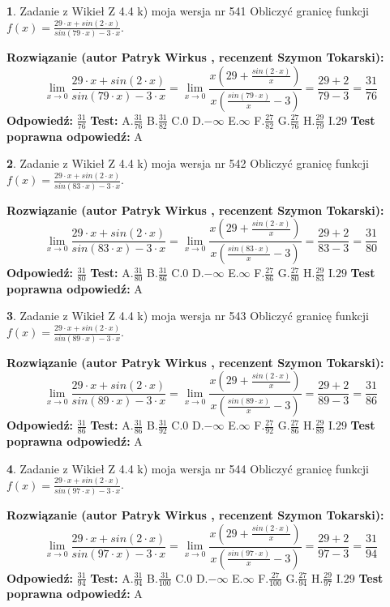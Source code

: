 \documentclass[12pt, a4paper]{article}
\theoremstyle{definition} %
\newtheorem{zad}{}
\newcommand{\zadStart}[1]{\begin{zad}#1\newline}
\newcommand{\zadStop}{\end{zad}}
\newcommand{\rozwStart}[2]{\noindent \textbf{Rozwiązanie (autor #1 , recenzent #2): }\newline}
\newcommand{\rozwStop}{\newline}
\newcommand{\odpStart}{\noindent \textbf{Odpowiedź:}\newline}
\newcommand{\odpStop}{\newline}
\newcommand{\testStart}{\noindent \textbf{Test:}\newline}
\newcommand{\testStop}{\newline}
\newcommand{\kluczStart}{\noindent \textbf{Test poprawna odpowiedź:}\newline}
\newcommand{\kluczStop}{\newline}
\begin{document}
\zadStart{Zadanie z Wikieł Z 4.4 k) moja wersja nr 541}
Obliczyć granicę funkcji $f(x)=\frac{29\cdot x +sin(2\cdot x)}{sin(79\cdot x) -3\cdot x}$.
\zadStop
\rozwStart{Patryk Wirkus}{Szymon Tokarski}
$$\lim\limits_{x\to 0}\frac{29\cdot x +sin(2\cdot x)}{sin(79\cdot x) -3\cdot x}
=\lim\limits_{x\to 0}\frac{x(29+\frac{sin(2\cdot x)}{x})}{x(\frac{sin(79\cdot x)}{x}-3)}
=\frac{29+2}{79-3} = \frac{31}{76}$$
\rozwStop
\odpStart
$\frac{31}{76}$
\odpStop
\testStart
A.$\frac{31}{76}$
B.$\frac{31}{82}$
C.$0$
D.$-\infty$
E.$\infty$
F.$\frac{27}{82}$
G.$\frac{27}{76}$
H.$\frac{29}{79}$
I.$29$
\testStop
\kluczStart
A
\kluczStop



\zadStart{Zadanie z Wikieł Z 4.4 k) moja wersja nr 542}
Obliczyć granicę funkcji $f(x)=\frac{29\cdot x +sin(2\cdot x)}{sin(83\cdot x) -3\cdot x}$.
\zadStop
\rozwStart{Patryk Wirkus}{Szymon Tokarski}
$$\lim\limits_{x\to 0}\frac{29\cdot x +sin(2\cdot x)}{sin(83\cdot x) -3\cdot x}
=\lim\limits_{x\to 0}\frac{x(29+\frac{sin(2\cdot x)}{x})}{x(\frac{sin(83\cdot x)}{x}-3)}
=\frac{29+2}{83-3} = \frac{31}{80}$$
\rozwStop
\odpStart
$\frac{31}{80}$
\odpStop
\testStart
A.$\frac{31}{80}$
B.$\frac{31}{86}$
C.$0$
D.$-\infty$
E.$\infty$
F.$\frac{27}{86}$
G.$\frac{27}{80}$
H.$\frac{29}{83}$
I.$29$
\testStop
\kluczStart
A
\kluczStop



\zadStart{Zadanie z Wikieł Z 4.4 k) moja wersja nr 543}
Obliczyć granicę funkcji $f(x)=\frac{29\cdot x +sin(2\cdot x)}{sin(89\cdot x) -3\cdot x}$.
\zadStop
\rozwStart{Patryk Wirkus}{Szymon Tokarski}
$$\lim\limits_{x\to 0}\frac{29\cdot x +sin(2\cdot x)}{sin(89\cdot x) -3\cdot x}
=\lim\limits_{x\to 0}\frac{x(29+\frac{sin(2\cdot x)}{x})}{x(\frac{sin(89\cdot x)}{x}-3)}
=\frac{29+2}{89-3} = \frac{31}{86}$$
\rozwStop
\odpStart
$\frac{31}{86}$
\odpStop
\testStart
A.$\frac{31}{86}$
B.$\frac{31}{92}$
C.$0$
D.$-\infty$
E.$\infty$
F.$\frac{27}{92}$
G.$\frac{27}{86}$
H.$\frac{29}{89}$
I.$29$
\testStop
\kluczStart
A
\kluczStop



\zadStart{Zadanie z Wikieł Z 4.4 k) moja wersja nr 544}
Obliczyć granicę funkcji $f(x)=\frac{29\cdot x +sin(2\cdot x)}{sin(97\cdot x) -3\cdot x}$.
\zadStop
\rozwStart{Patryk Wirkus}{Szymon Tokarski}
$$\lim\limits_{x\to 0}\frac{29\cdot x +sin(2\cdot x)}{sin(97\cdot x) -3\cdot x}
=\lim\limits_{x\to 0}\frac{x(29+\frac{sin(2\cdot x)}{x})}{x(\frac{sin(97\cdot x)}{x}-3)}
=\frac{29+2}{97-3} = \frac{31}{94}$$
\rozwStop
\odpStart
$\frac{31}{94}$
\odpStop
\testStart
A.$\frac{31}{94}$
B.$\frac{31}{100}$
C.$0$
D.$-\infty$
E.$\infty$
F.$\frac{27}{100}$
G.$\frac{27}{94}$
H.$\frac{29}{97}$
I.$29$
\testStop
\kluczStart
A
\kluczStop
\end{document}
